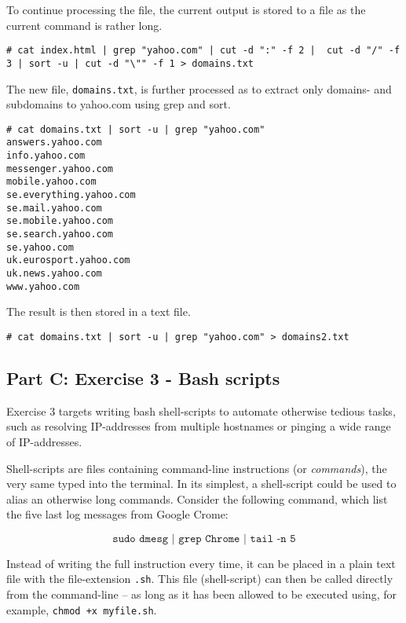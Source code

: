 To continue processing the file, the current output is stored to
a file as the current command is rather long.

\begin{lstlisting}[numbers=none, language={}, frame=single, framexleftmargin={0.2em}]
# cat index.html | grep "yahoo.com" | cut -d ":" -f 2 |  cut -d "/" -f 3 | sort -u | cut -d "\"" -f 1 > domains.txt
\end{lstlisting}

The new file, \texttt{domains.txt}, is further processed as to
extract only domains- and subdomains to yahoo.com using grep
and sort.

\begin{lstlisting}[numbers=none, language={}, frame=single, framexleftmargin={0.2em}]
# cat domains.txt | sort -u | grep "yahoo.com"
answers.yahoo.com
info.yahoo.com
messenger.yahoo.com
mobile.yahoo.com
se.everything.yahoo.com
se.mail.yahoo.com
se.mobile.yahoo.com
se.search.yahoo.com
se.yahoo.com
uk.eurosport.yahoo.com
uk.news.yahoo.com
www.yahoo.com
\end{lstlisting}

The result is then stored in a text file.

\begin{lstlisting}[numbers=none, language={}, frame=single, framexleftmargin={0.2em}]
# cat domains.txt | sort -u | grep "yahoo.com" > domains2.txt
\end{lstlisting}

\pagebreak
\subsection{Part C: Exercise 3 - Bash scripts}
Exercise 3 targets writing bash shell-scripts to automate otherwise tedious
tasks, such as resolving IP-addresses from multiple hostnames or pinging a
wide range of IP-addresses.

Shell-scripts are files containing command-line instructions (or \textit{commands}),
the very same typed into the terminal. In its simplest, a shell-script could be used to alias an
otherwise long commands. Consider the following command, which list the five last log
messages from Google Crome:

$$\texttt{sudo dmesg | grep Chrome | tail -n 5}$$

Instead of writing the full instruction every time, it can be placed in a plain
text file with the file-extension \texttt{.sh}. This file (shell-script) can
then be called directly from the command-line -- as long as it has been allowed
to be executed using, for example, \texttt{chmod +x myfile.sh}.

